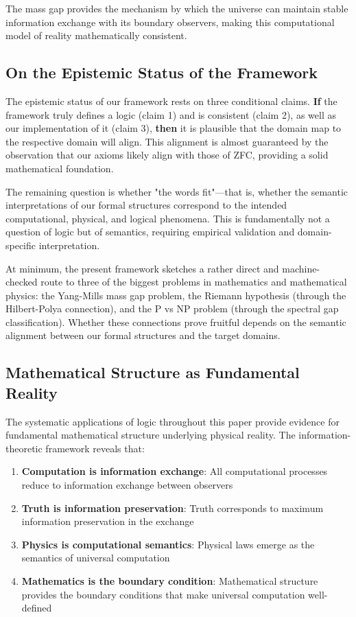 The mass gap provides the mechanism by which the universe can maintain stable information exchange with its boundary observers, making this computational model of reality mathematically consistent.

\subsection{On the Epistemic Status of the Framework}

The epistemic status of our framework rests on three conditional claims. \textbf{If} the framework truly defines a logic (claim 1) and is consistent (claim 2), as well as our implementation of it (claim 3), \textbf{then} it is plausible that the domain map to the respective domain will align. This alignment is almost guaranteed by the observation that our axioms likely align with those of ZFC, providing a solid mathematical foundation.

The remaining question is whether "the words fit"—that is, whether the semantic interpretations of our formal structures correspond to the intended computational, physical, and logical phenomena. This is fundamentally not a question of logic but of semantics, requiring empirical validation and domain-specific interpretation.

At minimum, the present framework sketches a rather direct and machine-checked route to three of the biggest problems in mathematics and mathematical physics: the Yang-Mills mass gap problem, the Riemann hypothesis (through the Hilbert-Polya connection), and the P vs NP problem (through the spectral gap classification). Whether these connections prove fruitful depends on the semantic alignment between our formal structures and the target domains.

\subsection{Mathematical Structure as Fundamental Reality}

The systematic applications of logic throughout this paper provide evidence for fundamental mathematical structure underlying physical reality. The information-theoretic framework reveals that:

\begin{enumerate}
\item \textbf{Computation is information exchange}: All computational processes reduce to information exchange between observers
\item \textbf{Truth is information preservation}: Truth corresponds to maximum information preservation in the exchange
\item \textbf{Physics is computational semantics}: Physical laws emerge as the semantics of universal computation
\item \textbf{Mathematics is the boundary condition}: Mathematical structure provides the boundary conditions that make universal computation well-defined
\end{enumerate}

